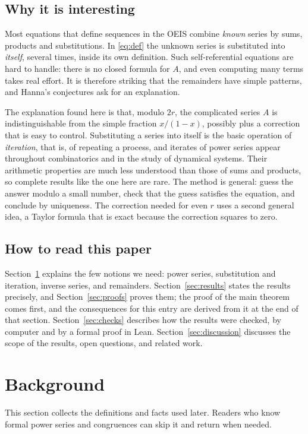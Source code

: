 \documentclass[11pt,a4paper]{article}
\theoremstyle{definition}
\theoremstyle{remark}
\begin{document}
\subsection{Why it is interesting}
Most equations that define sequences in the OEIS combine \emph{known} series by sums, products and substitutions.
In \eqref{eq:def} the unknown series is substituted into \emph{itself}, several times, inside its own definition.
Such self-referential equations are hard to handle: there is no closed formula for $A$, and even computing many terms
takes real effort. It is therefore striking that the remainders have simple patterns, and Hanna's conjectures ask
for an explanation.

The explanation found here is that, modulo $2r$, the complicated series $A$ is indistinguishable from the simple
fraction $x/(1-x)$, possibly plus a correction that is easy to control. Substituting a series into itself is the
basic operation of \emph{iteration}, that is, of repeating a process, and iterates of power series appear throughout
combinatorics and in the study of dynamical systems. Their arithmetic properties are much less understood than those
of sums and products, so complete results like the one here are rare. The method is general: guess the answer modulo
a small number, check that the guess satisfies the equation, and conclude by uniqueness. The correction needed for
even $r$ uses a second general idea, a Taylor formula that is exact because the correction squares to zero.

\subsection{How to read this paper}
Section~\ref{sec:background} explains the few notions we need: power series, substitution and iteration, inverse
series, and remainders. Section~\ref{sec:results} states the results precisely, and Section~\ref{sec:proofs} proves
them; the proof of the main theorem comes first, and the consequences for this entry are derived from it at the end of
that section. Section~\ref{sec:checks} describes how the results were checked, by computer and by a formal proof in
Lean. Section~\ref{sec:discussion} discusses the scope of the results, open questions, and related work.
\section{Background}\label{sec:background}
This section collects the definitions and facts used later. Readers who know formal power series and congruences can skip it and return when needed.
\end{document}
